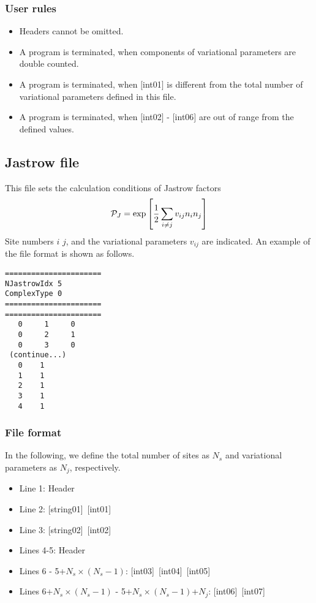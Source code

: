 \subsubsection{User rules}
\begin{itemize}
\item Headers cannot be omitted. 
\item A program is terminated, when components of variational parameters are double counted.
\item A program is terminated, when $[$int01$]$ is different from the total number of variational parameters defined in this file.
\item A program is terminated, when $[$int02$]$ - $[$int06$]$ are out of range from the defined values.
\end{itemize}

\newpage
\subsection{Jastrow file}
\label{Subsec:Jastrow}
This file sets the calculation conditions of Jastrow factors 
\begin{equation}
{\cal P}_J=\exp\left[\frac{1}{2} \sum_{i\neq j} v_{ij} n_i n_j\right]
\end{equation}
Site numbers $i$ $j$, and the variational parameters $v_{ij}$ are indicated.
An example of the file format is shown as follows.

\begin{minipage}{12.5cm}
\begin{screen}
\begin{verbatim}
======================
NJastrowIdx 5  
ComplexType 0
====================== 
======================
   0     1     0 
   0     2     1 
   0     3     0 
 (continue...)
   0    1 
   1    1 
   2    1 
   3    1 
   4    1 
\end{verbatim}
\end{screen}
\end{minipage}

\subsubsection{File format}
In the following, we define the total number of sites as $N_s$ and variational parameters as $N_j$, respectively.  

 \begin{itemize}
   \item  Line 1: Header
   \item  Line 2: [string01]~[int01]
   \item  Line 3: [string02]~[int02]
   \item  Lines 4-5:  Header
   \item  Lines 6 - 5+$N_s\times (N_s-1)$: [int03]~[int04]~[int05]
   \item  Lines 6+$N_s\times (N_s-1)$ - 5+$N_s\times (N_s-1)$+$N_j$: [int06]~[int07]
  \end{itemize}
